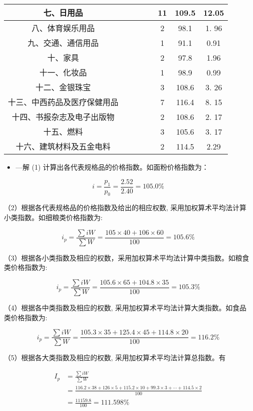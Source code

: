 \documentclass[10pt]{article}
\begin{document}
\begin{CJK*}{UTF8}{bsmi}
\begin{center}
\begin{tabular}{|c|c|c|c|c|c|c|c|}
\hline
七、日用品 &  &  &  &  & 11 & 109.5 & 12.05 \\
\hline
八、体育娱乐用品 &  &  &  &  & 2 & 98.1 & 1. 96 \\
\hline
九、交通、通信用品 &  &  &  &  & 1 & 91.1 & 0.91 \\
\hline
十、家具 &  &  &  &  & 2 & 97.8 & 1.96 \\
\hline
十一、化妆品 &  &  &  &  & 1 & 98.9 & 0.99 \\
\hline
十二、金银珠宝 &  &  &  &  & 3 & 108.6 & 3. 26 \\
\hline
十三、中西药品及医疗保健用品 &  &  &  &  & 7 & 116.4 & 8. 15 \\
\hline
十四、书报杂志及电子出版物 &  &  &  &  & 2 & 108.6 & 2. 17 \\
\hline
十五、燃料 &  &  &  &  & 3 & 105.6 & 3. 17 \\
\hline
十六、建筑材料及五金电料 &  &  &  &  & 2 & 114.5 & 2.29 \\
\hline
\end{tabular}
\end{center}

\begin{itemize}
  \item —解 (1) 计算出各代表规格品的价格指数。如面粉价格指数为：
\end{itemize}

$$
i=\frac{p_{1}}{p_{0}}=\frac{2.52}{2.40}=105.0 \%
$$

（2）根据各代表规格品的价格指数及给出的相应权数, 采用加权算术平均法计算小类指数。如细粮类价格指数为:

$$
i_{p}=\frac{\sum i W}{\sum W}=\frac{105 \times 40+106 \times 60}{100}=105.6 \%
$$

（3）根据各小类指数及相应的权数，采用加权算术平均法计算中类指数。如粮食类价格指数为:

$$
i_{p}=\frac{\sum i W}{\sum W}=\frac{105.6 \times 65+104.8 \times 35}{100}=105.3 \%
$$

（4）根据各中类指数及相应的权数, 采用加权算术平均法计算大类指数。如食品类价格指数为:

$$
i_{p}=\frac{\sum i W}{\sum W}=\frac{105.3 \times 35+125.4 \times 45+114.8 \times 20}{100}=116.2 \%
$$

（5）根据各大类指数及相应的权数, 采用加权算术平均法计算总指数。有

$$
\begin{aligned}
I_{p} & =\frac{\sum i W}{\sum W} \\
& =\frac{116.2 \times 38+126 \times 5+115.2 \times 10+99.3 \times 3+\cdots+114.5 \times 2}{100} \\
& =\frac{11159.8}{100}=111.598 \%
\end{aligned}
$$


\end{CJK*}
\end{document}
